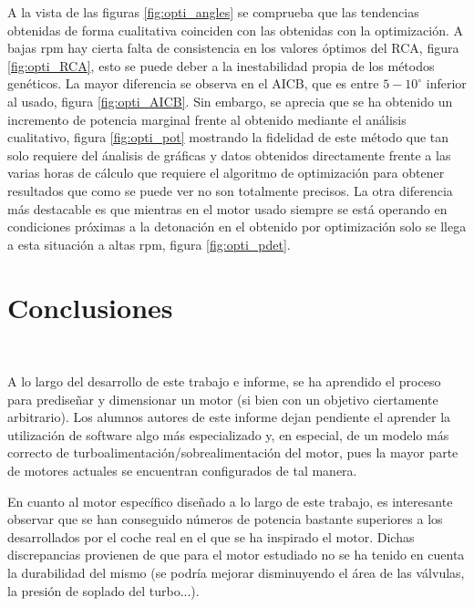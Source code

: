 A la vista de las figuras \ref{fig:opti_angles} se comprueba que las tendencias obtenidas de forma cualitativa coinciden con las obtenidas con la optimización. A bajas rpm hay %
cierta falta de consistencia en los valores óptimos del RCA, figura \ref{fig:opti_RCA}, esto se puede deber a la inestabilidad propia de los métodos genéticos. La mayor diferencia se %
observa en el AICB, que es entre $5-10^\circ$ inferior al usado, figura \ref{fig:opti_AICB}. Sin  embargo, se aprecia que se ha obtenido un incremento de potencia marginal frente al obtenido mediante el análisis cualitativo, figura \ref{fig:opti_pot} %
mostrando la fidelidad de este método que tan solo requiere del ánalisis de gráficas y datos obtenidos directamente frente a las varias horas de cálculo que requiere el algoritmo de optimización %
para obtener resultados que como se puede ver no son totalmente precisos. La otra diferencia más destacable es que mientras en el motor usado siempre se está operando en condiciones próximas a la %
detonación en el obtenido por optimización solo se llega a esta situación a altas rpm, figura \ref{fig:opti_pdet}.


\section{Conclusiones} \label{s:section_09}

A lo largo del desarrollo de este trabajo e informe, se ha aprendido el proceso para prediseñar y dimensionar un motor (si bien con un objetivo ciertamente arbitrario). Los alumnos autores de este informe dejan pendiente el aprender la utilización de software algo más especializado y, en especial, de un modelo más correcto de turboalimentación/sobrealimentación del motor, pues la mayor parte de motores actuales se encuentran configurados de tal manera.

En cuanto al motor específico diseñado a lo largo de este trabajo, es interesante observar que se han conseguido números de potencia bastante superiores a los desarrollados por el coche real en el que se ha inspirado el motor. Dichas discrepancias provienen de que para el motor estudiado no se ha tenido en cuenta la durabilidad del mismo (se podría mejorar disminuyendo el área de las válvulas, la presión de soplado del turbo...).

